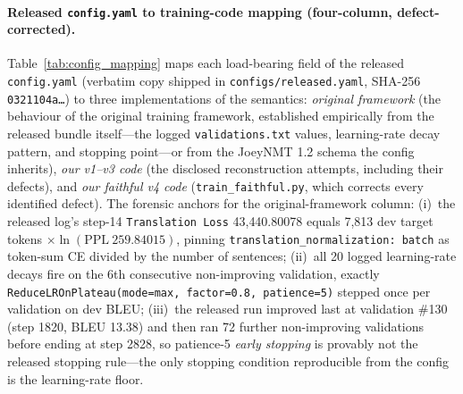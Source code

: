 \documentclass[pdflatex,sn-chicago]{sn-jnl}
\begin{document}
\paragraph{Released \texttt{config.yaml} to training-code mapping (four-column, defect-corrected).}
\label{sec:config_mapping}
Table~\ref{tab:config_mapping} maps each load-bearing field of the released \texttt{config.yaml} (verbatim copy shipped in \texttt{configs/released.yaml}, SHA-256 \texttt{0321104a\ldots}) to three implementations of the semantics: \emph{original framework} (the behaviour of the original training framework, established empirically from the released bundle itself---the logged \texttt{validations.txt} values, learning-rate decay pattern, and stopping point---or from the JoeyNMT 1.2 schema the config inherits), \emph{our v1--v3 code} (the disclosed reconstruction attempts, including their defects), and \emph{our faithful v4 code} (\texttt{train\_faithful.py}, which corrects every identified defect). The forensic anchors for the original-framework column: (i)~the released log's step-14 \texttt{Translation Loss} 43{,}440.80078 equals 7{,}813 dev target tokens $\times\ln(\mathrm{PPL}\ 259.84015)$, pinning \texttt{translation\_normalization: batch} as token-sum CE divided by the number of sentences; (ii)~all 20 logged learning-rate decays fire on the 6th consecutive non-improving validation, exactly \texttt{ReduceLROnPlateau(mode=max, factor=0.8, patience=5)} stepped once per validation on dev BLEU; (iii)~the released run improved last at validation \#130 (step 1820, BLEU 13.38) and then ran 72 further non-improving validations before ending at step 2828, so patience-5 \emph{early stopping} is provably not the released stopping rule---the only stopping condition reproducible from the config is the learning-rate floor.
\end{document}
